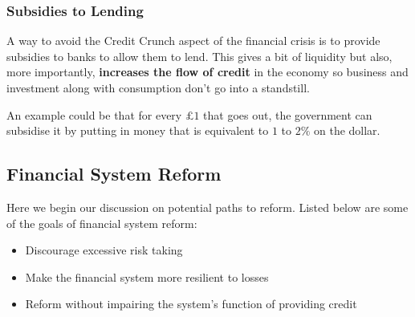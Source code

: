 \documentclass[12pt, letterpaper]{article}
\begin{document}
\subsubsection{Subsidies to Lending}
A way to avoid the Credit Crunch aspect of the financial crisis is to provide subsidies to banks to allow them to lend. This gives a bit of liquidity but also, more importantly, \textbf{increases the flow of credit} in the economy so business and investment along with consumption don't go into a standstill.

An example could be that for every $£1$ that goes out, the government can subsidise it by putting in money that is equivalent to $1$ to $2\%$ on the dollar.

\subsection{Financial System Reform}
Here we begin our discussion on potential paths to reform. Listed below are some of the goals of financial system reform:
\begin{itemize}
	\item Discourage excessive risk taking
	\item Make the financial system more resilient to losses
	\item Reform without impairing the system's function of providing credit
\end{itemize}
\end{document}
